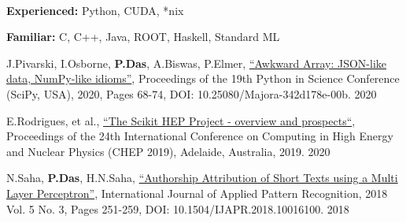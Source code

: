 \documentclass[10pt, letterpaper]{fulldeps}
\begin{document}
\vspace{-3pt}

%
%
\vspace{-5pt}
\\
\vspace{-20pt}

%
%
\vspace{-5pt}
\textbf{Experienced:} Python, CUDA, *nix

\textbf{Familiar:} C, C++, Java, ROOT, Haskell,  Standard ML
\vspace{-6pt}

%
%
\small{\begin{tightitemize}
    \item J.Pivarski, I.Osborne, {\textbf{P.Das}}, A.Biswas, P.Elmer, {\href{http://conference.scipy.org/proceedings/scipy2020/jim_pivarski.html}{``Awkward Array: JSON-like data, NumPy-like idioms''}}, Proceedings of the 19th Python in Science Conference (SciPy, USA), 2020, Pages 68-74, DOI: 10.25080/Majora-342d178e-00b. \hfill{2020}
    \item E.Rodrigues, et al., {\href{https://arxiv.org/abs/2007.03577}{``The Scikit HEP Project - overview and prospects``}}, Proceedings of the 24th International Conference on Computing in High Energy and Nuclear Physics (CHEP 2019), Adelaide, Australia, 2019. \hfill{2020}
    \item N.Saha, {\textbf{P.Das}}, H.N.Saha, {\href{https://www.inderscienceonline.com/doi/abs/10.1504/IJAPR.2018.094819}{``Authorship Attribution of Short Texts using a Multi Layer Perceptron''}}, International Journal of Applied Pattern Recognition, 2018 Vol. 5 No. 3, Pages 251-259, DOI: 10.1504/IJAPR.2018.10016100. \hfill{2018}
\end{tightitemize}}
\end{document}
